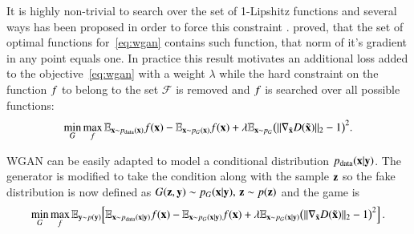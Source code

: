 It is highly non-trivial to search over the set of 1-Lipshitz functions and several ways has been proposed in order to force this constraint \cite{arjovsky2017wasserstein,gulrajani2017improved}. \cite{gulrajani2017improved} proved, that the set of optimal functions for~\cref{eq:wgan} contains such function, that norm of it's gradient in any point equals one. In practice this result motivates an additional loss added to the objective~\cref{eq:wgan} with a weight $\lambda$ while the hard constraint on the function $f$ to belong to the set $\mathcal{F}$ is removed and $f$ is searched over all possible functions:    
\begin{equation}\label{gpwgan-loss}
\min_G \max_f \mathbb{E}_{\mathbf{x} \sim p_{\text{data}}(\mathbf{x})}  f(\mathbf{x}) - \mathbb{E}_{\mathbf{x} \sim  p_{G} (\mathbf{x})} f(\mathbf{x}) + 
\lambda \mathbb{E}_{\mathbf{x} \sim  p_{G} } \big(\|\nabla_{\tilde{\mathbf{x}}} D(\tilde{\mathbf{x}})\|_2 - 1\big)^2 .
\end{equation}

WGAN can be easily adapted to model a conditional distribution $p_{\text{data}}(\mathbf{x} | \mathbf{y})$. The generator is modified to take the condition along with the sample $\mathbf{z}$ so the fake distribution is now defined as $G(\mathbf{z}, \mathbf{y}) \sim  p_{G} (\mathbf{x} | \mathbf{y}),\, \mathbf{z} \sim p(\mathbf{z})$ and the game is 
\begin{equation}\label{CWGAN}
\min_G \max_f \mathbb{E}_{\mathbf{y} \sim p(\mathbf{y})} \Big[ \mathbb{E}_{\mathbf{x} \sim p_{\text{data}}(\mathbf{x} | \mathbf{y})}  f(\mathbf{x}) - \mathbb{E}_{\mathbf{x} \sim  p_{G} (\mathbf{x} | \mathbf{y})} f(\mathbf{x}) + 
\lambda \mathbb{E}_{\mathbf{x} \sim  p_{G} (\mathbf{x} | \mathbf{y})} \big(\|\nabla_{\tilde{\mathbf{x}}} D(\tilde{\mathbf{x}})\|_2 - 1\big)^2 \Big]\,.
\end{equation}



